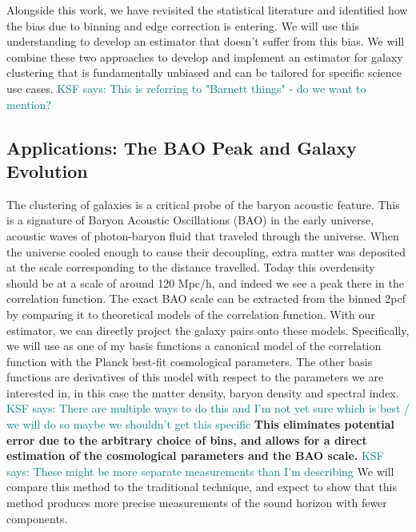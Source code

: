 \documentclass[12pt, fullpage, letterpaper]{article}
\newcommand{\KSF}[1]{\textcolor{teal}{KSF says: #1}}
\newcommand{\cf}{2pcf\xspace}
\begin{document}
Alongside this work, we have revisited the statistical literature and identified how the bias due to binning and edge correction is entering. 
We will use this understanding to develop an estimator that doesn't suffer from this bias.
We will combine these two approaches to develop and implement an estimator for galaxy clustering that is fundamentally unbiased and can be tailored for specific science use cases.
\KSF{This is referring to "Barnett things" - do we want to mention?}

\subsection{Applications: The BAO Peak and Galaxy Evolution}

The clustering of galaxies is a critical probe of the baryon acoustic feature. 
This is a signature of Baryon Acoustic Oscillations (BAO) in the early universe, acoustic waves of photon-baryon fluid that traveled through the universe. 
When the universe cooled enough to cause their decoupling, extra matter was deposited at the scale corresponding to the distance travelled. 
Today this overdensity should be at a scale of around 120 Mpc/h, and indeed we see a peak there in the correlation function. 
The exact BAO scale can be extracted from the binned \cf by comparing it to theoretical models of the correlation function. 
With our estimator, we can directly project the galaxy pairs onto these models. 
Specifically, we will use as one of my basis functions a canonical model of the correlation function with the Planck best-fit cosmological parameters. 
The other basis functions are derivatives of this model with respect to the parameters we are interested in, in this case the matter density, baryon density and spectral index. \KSF{There are multiple ways to do this and I'm not yet sure which is best / we will do so maybe we shouldn't get this specific}
\textbf{This eliminates potential error due to the arbitrary choice of bins, and allows for a direct estimation of the cosmological parameters and the BAO scale.} \KSF{These might be more separate measurements than I'm describing}
We will compare this method to the traditional technique, and expect to show that this method produces more precise measurements of the sound horizon with fewer components.
\end{document}
